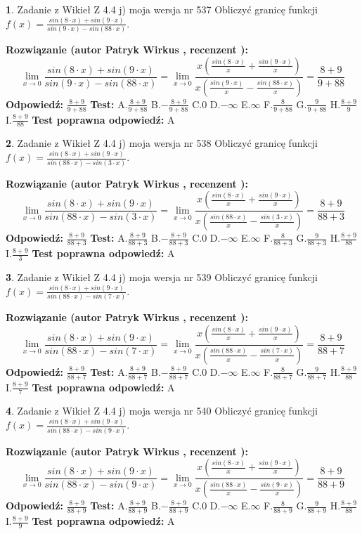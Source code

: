 \documentclass[12pt, a4paper]{article}
\theoremstyle{definition} %
\newtheorem{zad}{}
\newcommand{\zadStart}[1]{\begin{zad}#1\newline}
\newcommand{\zadStop}{\end{zad}}
\newcommand{\rozwStart}[2]{\noindent \textbf{Rozwiązanie (autor #1 , recenzent #2): }\newline}
\newcommand{\rozwStop}{\newline}
\newcommand{\odpStart}{\noindent \textbf{Odpowiedź:}\newline}
\newcommand{\odpStop}{\newline}
\newcommand{\testStart}{\noindent \textbf{Test:}\newline}
\newcommand{\testStop}{\newline}
\newcommand{\kluczStart}{\noindent \textbf{Test poprawna odpowiedź:}\newline}
\newcommand{\kluczStop}{\newline}
\begin{document}
\zadStart{Zadanie z Wikieł Z 4.4 j) moja wersja nr 537}
Obliczyć granicę funkcji $f(x)=\frac{sin(8\cdot x) +sin(9\cdot x)}{sin(9\cdot x) -sin(88\cdot x)}$.
\zadStop
\rozwStart{Patryk Wirkus}{}
$$\lim\limits_{x\to 0}\frac{sin(8\cdot x) +sin(9\cdot x)}{sin(9\cdot x) -sin(88\cdot x)}=\lim\limits_{x\to 0}\frac{x(\frac{sin(8\cdot x)}{x}+\frac{sin(9\cdot x)}{x})}{x(\frac{sin(9\cdot x)}{x}-\frac{sin(88\cdot x)}{x})}=\frac{8+9}{9+88}$$
\rozwStop
\odpStart
$\frac{8+9}{9+88}$
\odpStop
\testStart
A.$\frac{8+9}{9+88}$
B.$-\frac{8+9}{9+88}$
C.$0$
D.$-\infty$
E.$\infty$
F.$\frac{8}{9+88}$
G.$\frac{9}{9+88}$
H.$\frac{8+9}{9}$
I.$\frac{8+9}{88}$
\testStop
\kluczStart
A
\kluczStop



\zadStart{Zadanie z Wikieł Z 4.4 j) moja wersja nr 538}
Obliczyć granicę funkcji $f(x)=\frac{sin(8\cdot x) +sin(9\cdot x)}{sin(88\cdot x) -sin(3\cdot x)}$.
\zadStop
\rozwStart{Patryk Wirkus}{}
$$\lim\limits_{x\to 0}\frac{sin(8\cdot x) +sin(9\cdot x)}{sin(88\cdot x) -sin(3\cdot x)}=\lim\limits_{x\to 0}\frac{x(\frac{sin(8\cdot x)}{x}+\frac{sin(9\cdot x)}{x})}{x(\frac{sin(88\cdot x)}{x}-\frac{sin(3\cdot x)}{x})}=\frac{8+9}{88+3}$$
\rozwStop
\odpStart
$\frac{8+9}{88+3}$
\odpStop
\testStart
A.$\frac{8+9}{88+3}$
B.$-\frac{8+9}{88+3}$
C.$0$
D.$-\infty$
E.$\infty$
F.$\frac{8}{88+3}$
G.$\frac{9}{88+3}$
H.$\frac{8+9}{88}$
I.$\frac{8+9}{3}$
\testStop
\kluczStart
A
\kluczStop



\zadStart{Zadanie z Wikieł Z 4.4 j) moja wersja nr 539}
Obliczyć granicę funkcji $f(x)=\frac{sin(8\cdot x) +sin(9\cdot x)}{sin(88\cdot x) -sin(7\cdot x)}$.
\zadStop
\rozwStart{Patryk Wirkus}{}
$$\lim\limits_{x\to 0}\frac{sin(8\cdot x) +sin(9\cdot x)}{sin(88\cdot x) -sin(7\cdot x)}=\lim\limits_{x\to 0}\frac{x(\frac{sin(8\cdot x)}{x}+\frac{sin(9\cdot x)}{x})}{x(\frac{sin(88\cdot x)}{x}-\frac{sin(7\cdot x)}{x})}=\frac{8+9}{88+7}$$
\rozwStop
\odpStart
$\frac{8+9}{88+7}$
\odpStop
\testStart
A.$\frac{8+9}{88+7}$
B.$-\frac{8+9}{88+7}$
C.$0$
D.$-\infty$
E.$\infty$
F.$\frac{8}{88+7}$
G.$\frac{9}{88+7}$
H.$\frac{8+9}{88}$
I.$\frac{8+9}{7}$
\testStop
\kluczStart
A
\kluczStop



\zadStart{Zadanie z Wikieł Z 4.4 j) moja wersja nr 540}
Obliczyć granicę funkcji $f(x)=\frac{sin(8\cdot x) +sin(9\cdot x)}{sin(88\cdot x) -sin(9\cdot x)}$.
\zadStop
\rozwStart{Patryk Wirkus}{}
$$\lim\limits_{x\to 0}\frac{sin(8\cdot x) +sin(9\cdot x)}{sin(88\cdot x) -sin(9\cdot x)}=\lim\limits_{x\to 0}\frac{x(\frac{sin(8\cdot x)}{x}+\frac{sin(9\cdot x)}{x})}{x(\frac{sin(88\cdot x)}{x}-\frac{sin(9\cdot x)}{x})}=\frac{8+9}{88+9}$$
\rozwStop
\odpStart
$\frac{8+9}{88+9}$
\odpStop
\testStart
A.$\frac{8+9}{88+9}$
B.$-\frac{8+9}{88+9}$
C.$0$
D.$-\infty$
E.$\infty$
F.$\frac{8}{88+9}$
G.$\frac{9}{88+9}$
H.$\frac{8+9}{88}$
I.$\frac{8+9}{9}$
\testStop
\kluczStart
A
\kluczStop
\end{document}
